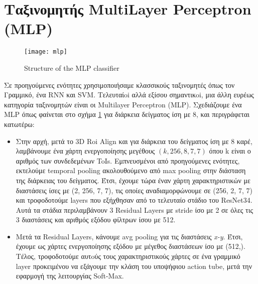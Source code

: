 \section{Ταξινομητής \en MultiLayer Perceptron (MLP)}
\begin{figure}[h]
  \en
  \centering
  \texttt{[image: mlp]}
  \caption{\en Structure of the MLP classifier \gr}
  \label{fig:gr_mlp_structure}
\end{figure}
\gr
Σε προηγούμενες ενότητες χρησιμοποιήσαμε κλασσικούς ταξινομητές όπως τον Γραμμικό, ένα \en RNN \gr και \en SVM\gr.
Τελευταίoi αλλά εξίσου σημαντικoi, μια άλλη ευρέως κατηγορία ταξινομητών είναι οι \en Multilayer Perceptron (MLP)\gr.
Σχεδιάζουμε ένα MLP όπως φαίνεται στο σχήμα \ref{fig:gr_mlp_structure} για διάρκεια δείγματος ίση με 8, και περιγράφεται κατωτέρω:

\begin{itemize}
\item Στην αρχή, μετά το \en 3D Roi Align \gr και για  διάρκεια του δείγματος ίση με  8 καρέ,
λαμβάνουμε ένα χάρτη ενεργοποίησης μεγέθους  $(k, 256, 8, 7, 7)$ όπου k είναι ο αριθμός των συνδεδεμένων ToIs. Εμπνευσμένοι
από προηγούμενες ενότητες, εκτελούμε \en temporal pooling \gr ακολουθούμενο  από
\en max pooling \gr  στην  διάσταση της διάρκειας του δείγματος. Έτσι, έχουμε τώρα έναν χάρτη χαρακτηριστικών 
με διαστάσεις ίσες με (2, 256, 7, 7), τις οποίες αναδιαμορφώνουμε σε
(256, 2, 7, 7) και τροφοδοτούμε \en layers \gr που εξήχθησαν από το τελευταίο στάδιο του \en ResNet34\gr.
Αυτά τα στάδια περιλαμβάνουν 3 \en Residual Layers \gr  με \en stride \gr  ίσο με 2 σε όλες τις 3
διαστάσεις και αριθμός εξόδου φίλτρων ίσου με 512.
\item Μετά τα \en Residual Layers\gr, κάνουμε \en avg pooling \gr για τις διαστάσεις \en \textit{ x-y}\gr.
Έτσι, έχουμε ως χάρτες ενεργοποίησης εξόδου με μέγεθος διαστάσεων ίσο με (512,).
Τέλος, τροφοδοτούμε  αυτoύς  τους  χαρακτηριστικούς  χάρτες σε ένα γραμμικό \en layer \gr προκειμένου να εξάγουμε την κλάση
του υποψήφιου \en action tube, \gr μετά την εφαρμογή της λειτουργίας \en  Soft-Max\gr.
\end{itemize}

